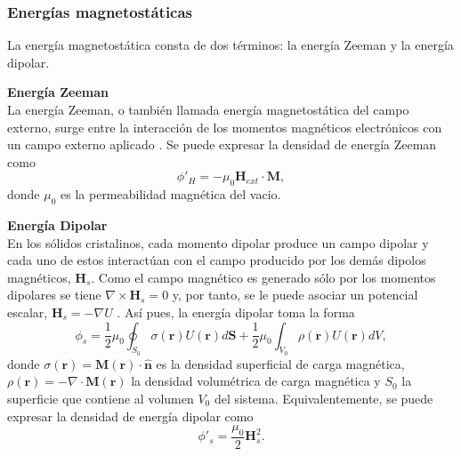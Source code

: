 \subsubsection{Energías magnetostáticas}
La energía magnetostática consta de dos términos: la energía Zeeman y la energía dipolar.

\vspace{10pt}

\textbf{Energía Zeeman}\\
La energía Zeeman, o también llamada energía magnetostática del campo externo, surge entre la interacción de los momentos magnéticos electrónicos con un campo externo aplicado \cite{Exl2020}. Se puede expresar la densidad de energía Zeeman como \[ \phi'_H = - \mu_0 \mathbf{H}_{ext} \cdot \mathbf{M},\] donde $\mu_0$ es la permeabilidad magnética del vacio.

\vspace{10pt}

\textbf{Energía Dipolar}\\
En los sólidos cristalinos, cada momento dipolar produce un campo dipolar y cada uno de estos interactúan con el campo producido por los demás dipolos magnéticos, $\mathbf{H}_s$. Como el campo magnético es generado sólo por los momentos dipolares se tiene $\nabla \times \mathbf{H}_s = 0$ y, por tanto, se le puede asociar un potencial escalar, $\mathbf{H}_s = - \nabla U$ \cite{KronmüllerMicromagnetism}. Así pues, la energía dipolar toma la forma \[ \phi_s = \frac{1}{2} \mu_0 \oint_{S_0} \sigma(\mathbf{r}) U(\mathbf{r}) d \mathbf{S} + \frac{1}{2} \mu_0 \int_{V_0} \rho (\mathbf{r}) U(\mathbf{r}) dV ,\] donde $\sigma(\mathbf{r}) = \mathbf{M} (\mathbf{r}) \cdot \hat{\mathbf{n}}$ es la densidad superficial de carga magnética, $\rho(\mathbf{r}) = - \nabla \cdot \mathbf{M} (\mathbf{r})$ la densidad volumétrica de carga magnética y $S_0$ la superficie que contiene al volumen $V_0$ del sistema. Equivalentemente, se puede expresar la densidad de energía dipolar como \[ \phi'_s = \frac{\mu_0}{2} \mathbf{H}_s^2 .\]


